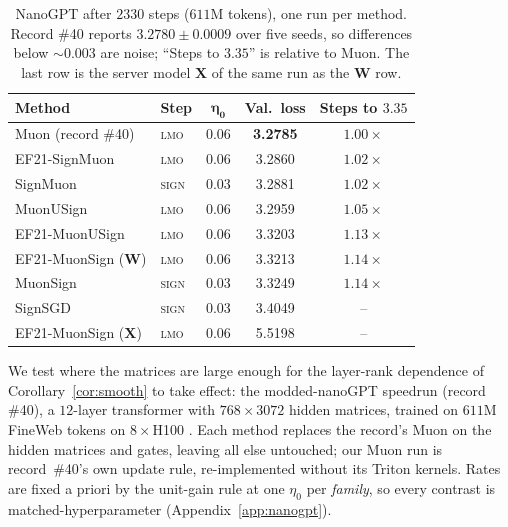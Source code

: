 \begin{table}[!tb]
\centering\small
\setlength{\tabcolsep}{4pt}
\begin{tabular}{@{}llccc@{}}
\toprule
\textbf{Method} & \textbf{Step} & $\boldsymbol{\eta_0}$ & \textbf{Val.\ loss} & \textbf{Steps to $3.35$} \\
\midrule
Muon (record \#40)   & \textsc{lmo}  & 0.06 & \textbf{3.2785} & $1.00\times$ \\
EF21-SignMuon        & \textsc{lmo}  & 0.06 & 3.2860 & $1.02\times$ \\
SignMuon             & \textsc{sign} & 0.03 & 3.2881 & $1.02\times$ \\
MuonUSign            & \textsc{lmo}  & 0.06 & 3.2959 & $1.05\times$ \\
EF21-MuonUSign       & \textsc{lmo}  & 0.06 & 3.3203 & $1.13\times$ \\
EF21-MuonSign ($\mathbf{W}$) & \textsc{lmo} & 0.06 & 3.3213 & $1.14\times$ \\
MuonSign             & \textsc{sign} & 0.03 & 3.3249 & $1.14\times$ \\
SignSGD              & \textsc{sign} & 0.03 & 3.4049 & -- \\
\midrule
EF21-MuonSign ($\mathbf{X}$) & \textsc{lmo} & 0.06 & 5.5198 & -- \\
\bottomrule
\end{tabular}
\caption{NanoGPT after $2330$ steps ($611$M tokens), one run per method. Record \#40 reports $3.2780\pm0.0009$ over five seeds, so differences below ${\sim}0.003$ are noise; ``Steps to $3.35$'' is relative to Muon. The last row is the server model $\mathbf{X}$ of the same run as the $\mathbf{W}$ row.}
\label{tab:nanogpt}
\end{table}

We test where the matrices are large enough for the layer-rank dependence of Corollary~\ref{cor:smooth} to take effect: the modded-nanoGPT speedrun (record \#40), a $12$-layer transformer with $768\times3072$ hidden matrices, trained on $611$M FineWeb tokens on $8\times$H100 \citep{jordan2024moddednanogpt}. Each method replaces the record's Muon on the hidden matrices and gates, leaving all else untouched; our Muon run is record~\#40's own update rule, re-implemented without its Triton kernels. Rates are fixed a priori by the unit-gain rule at one $\eta_0$ per \emph{family}, so every contrast is matched-hyperparameter (Appendix~\ref{app:nanogpt}).

